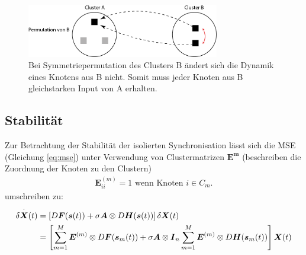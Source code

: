 	\begin{figure}
		\includegraphics[width=0.75\textwidth]{abb/misc/perm_b.png}
		\caption{Bei Symmetriepermutation des Clusters B ändert sich die Dynamik eines Knotens aus B nicht. Somit muss jeder Knoten aus B gleichstarken Input von A erhalten.}
		\label{fig:permb}
	\end{figure}
	

\subsection*{Stabilität}
\label{stabilitaet}
Zur Betrachtung der Stabilität der isolierten Synchronisation lässt sich die MSE (Gleichung \ref{eq:mse})  unter Verwendung von Clustermatrizen $\boldsymbol{E^m}$ (beschreiben die Zuordnung der Knoten zu den Clustern)
\begin{align}
 \boldsymbol{E}^{(m)}_{ii} =1\text{ wenn Knoten }i \in C_m.
\end{align}
 umschreiben zu:
\begin{align}
	\label{eq:clustermse}
\notag	\delta\overset{\cdot}{\boldsymbol{X}}(t)&=	
	\left[D\boldsymbol{F}(\boldsymbol{s}(t))+\sigma\boldsymbol{A}\otimes D\boldsymbol{H}(\boldsymbol{s}(t))\right]\delta\boldsymbol{X}(t)\\&=
	\left[\sum_{m=1}^{M} \boldsymbol{E}^{(m)} \otimes D\boldsymbol{F}(\boldsymbol{s}_m(t))+\sigma\boldsymbol{A}\otimes \boldsymbol{I}_n\sum_{m=1}^{M} 			\boldsymbol{E}^{(m)}\otimes D\boldsymbol{H}(\boldsymbol{s}_m(t))\right]\boldsymbol{X}(t)
	\end{align}
	
